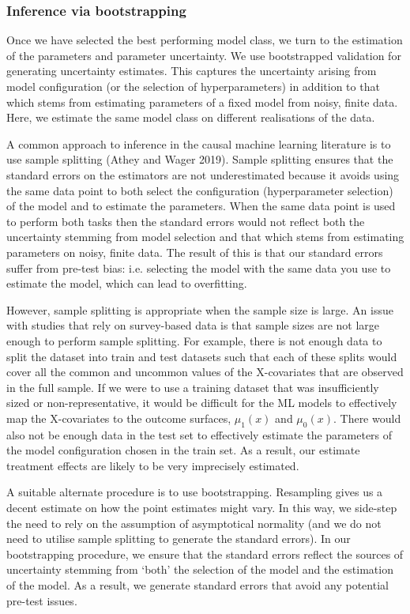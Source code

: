 \documentclass[12pt, a4paper]{article}
\begin{document}
\subsubsection*{Inference via bootstrapping}

Once we have selected the best performing model class, we turn to the estimation of the parameters and parameter uncertainty. We use bootstrapped validation for generating uncertainty estimates. This captures the uncertainty arising from model configuration (or the selection of hyperparameters) in addition to that which stems from estimating parameters of a fixed model from noisy, finite data. Here, we estimate the same model class on different realisations of the data. 

A common approach to inference in the causal machine learning literature is to use sample splitting (Athey and Wager 2019). Sample splitting ensures that the standard errors on the estimators are not underestimated because it avoids using the same data point to both select the configuration (hyperparameter selection) of the model and to estimate the parameters. When the same data point is used to perform both tasks then the standard errors would not reflect both the uncertainty stemming from model selection and that which stems from estimating parameters on noisy, finite data. The result of this is that our standard errors suffer from pre-test bias: i.e. selecting the model with the same data you use to estimate the model, which can lead to overfitting.

However, sample splitting is appropriate when the sample size is large. An issue with studies that rely on survey-based data is that sample sizes are not large enough to perform sample splitting. For example, there is not enough data to split the dataset into train and test datasets such that each of these splits would cover all the common and uncommon values of the X-covariates that are observed in the full sample. If we were to use a training dataset that was insufficiently sized or non-representative, it would be difficult for the ML models to effectively map the X-covariates to the outcome surfaces, $\mu_1(x)$ and $\mu_0(x)$. There would also not be enough data in the test set to effectively estimate the parameters of the model configuration chosen in the train set. As a result, our estimate treatment effects are likely to be very imprecisely estimated. 

A suitable alternate procedure is to use bootstrapping. Resampling gives us a decent estimate on how the point estimates might vary. In this way, we side-step the need to rely on the assumption of asymptotical normality (and we do not need to utilise sample splitting to generate the standard errors). In our bootstrapping procedure, we ensure that the standard errors reflect the sources of uncertainty stemming from ‘both’ the selection of the model and the estimation of the model. As a result, we generate standard errors that avoid any potential pre-test issues.
\end{document}
